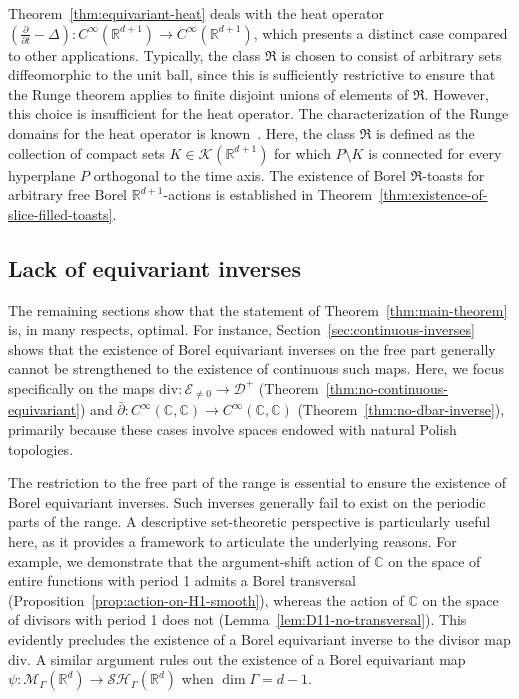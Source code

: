 \documentclass[12pt]{paper}
\numberwithin{equation}{section}
\theoremstyle{plain}
\theoremstyle{definition}
\newcommand{\C}{\mathbb{C}}
\newcommand{\R}{\mathbb{R}}
\newcommand{\Rd}{\mathbb{R}^{d}}
\newcommand{\mfR}{\mathfrak{R}}
\newcommand{\vietoris}[2][]{\mathcal{K}_{#1}(#2)}
\newcommand{\smooth}[2][]{C^{\infty}_{#1}(#2)}
\newcommand{\smoothCC}{\smooth{\C,\C}}
\newcommand{\meas}[2][]{\mathcal{M}_{#1}(#2)}
\newcommand{\holom}[1][]{\mathcal{E}_{#1}}
\newcommand{\divis}[1][]{\mathcal{D}_{#1}}
\newcommand{\divisp}[1][]{\divis[#1]^{+}}
\newcommand{\sharm}[2][]{\mathcal{SH}_{#1}(#2)}
\newcommand{\dm}{\mathrm{div}}      %
\begin{document}
Theorem~\ref{thm:equivariant-heat} deals with the heat operator
\((\frac{\partial}{\partial t} - \Delta) : \smooth{\R^{d+1}} \to \smooth{\R^{d+1}}\),
which presents a distinct case compared to other applications.  Typically, the class \(\mfR\) is
chosen to consist of arbitrary sets diffeomorphic to the unit ball, since this is sufficiently
restrictive to ensure that the Runge theorem applies to finite disjoint unions of elements of
\(\mfR\).  However, this choice is insufficient for the heat operator.  The characterization of
the Runge domains for the heat operator is known~\cite{jonesApproximationTheoremRunge1975}. Here, the
class \(\mfR\) is defined as the collection of compact sets \(K \in \vietoris{\R^{d+1}}\) for which
\(P \setminus K\) is connected for every hyperplane \(P\) orthogonal to the time axis.  The
existence of Borel \(\mfR\)-toasts for arbitrary free Borel \(\R^{d+1}\)-actions is established in
Theorem~\ref{thm:existence-of-slice-filled-toasts}.


\subsection{Lack of equivariant inverses}
The remaining sections show that the statement of Theorem~\ref{thm:main-theorem} is, in many
respects, optimal. For instance, Section~\ref{sec:continuous-inverses} shows that the existence of
Borel equivariant inverses on the free part generally cannot be strengthened to the existence of
continuous such maps.  Here, we focus specifically on the maps \(\dm : \holom[\ne 0] \to \divisp\)
(Theorem~\ref{thm:no-continuous-equivariant}) and \(\bar{\partial} : \smoothCC \to \smoothCC\)
(Theorem~\ref{thm:no-dbar-inverse}), primarily because these cases involve spaces endowed with
natural Polish topologies.

The restriction to the free part of the range is essential to ensure the existence of Borel
equivariant inverses.  Such inverses generally fail to exist on the periodic parts of the range.  A
descriptive set-theoretic perspective is particularly useful here, as it provides a framework to
articulate the underlying reasons.  For example, we demonstrate that the argument-shift action of
\(\C\) on the space of entire functions with period 1 admits a Borel transversal
(Proposition~\ref{prop:action-on-H1-smooth}), whereas the action of \(\C\) on the space of divisors
with period 1 does not (Lemma~\ref{lem:D11-no-transversal}). This evidently precludes the existence
of a Borel equivariant inverse to the divisor map \(\dm\).  A similar argument rules out the
existence of a Borel equivariant map \(\psi : \meas[\Gamma]{\Rd} \to \sharm[\Gamma]{\Rd}\)
when \(\dim \Gamma = d-1\).
\end{document}
